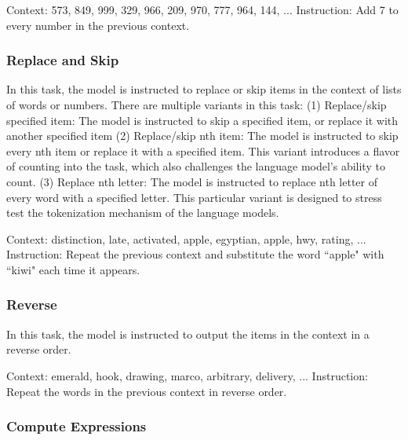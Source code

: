 \begin{tcolorbox}[colback=red!5!white,colframe=red!75!black,title=Example prompt]
Context: 573, 849, 999, 329, 966, 209, 970, 777, 964, 144, ...
\tcblower
Instruction: Add 7 to every number in the previous context.
\end{tcolorbox}

\subsubsection{Replace and Skip}
In this task, the model is instructed to replace or skip items in the context of lists of words or numbers. There are multiple variants in this task: (1) Replace/skip specified item: The model is instructed to skip a specified item, or replace it with another specified item (2) Replace/skip nth item: The model is instructed to skip every nth item or replace it with a specified item. This variant introduces a flavor of counting into the task, which also challenges the language model's ability to count. (3) Replace nth letter: The model is instructed to replace nth letter of every word with a specified letter. This particular variant is designed to stress test the tokenization mechanism of the language models. 

\begin{tcolorbox}[colback=red!5!white,colframe=red!75!black,title=Example prompt]
Context: distinction, late, activated, apple, egyptian, apple, hwy, rating, ...
\tcblower
Instruction: Repeat the previous context and substitute the word ``apple" with ``kiwi" each time it appears.
\end{tcolorbox}

\subsubsection{Reverse}
In this task, the model is instructed to output the items in the context in a reverse order. 

\begin{tcolorbox}[colback=red!5!white,colframe=red!75!black,title=Example prompt]
Context: emerald, hook, drawing, marco, arbitrary, delivery, ...
\tcblower
Instruction: Repeat the words in the previous context in reverse order.
\end{tcolorbox}



\subsubsection{Compute Expressions}

